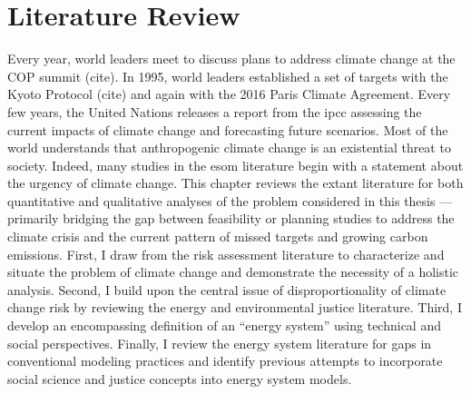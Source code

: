 \chapter{Literature Review}
\label{chapter:lit-review}
Every year, world leaders meet to discuss plans to address climate change at the
COP summit (cite). In 1995, world leaders established a set of targets with the
Kyoto Protocol (cite) and again with the 2016 Paris Climate Agreement. Every few
years, the United Nations releases a report from the \ac{ipcc} assessing the
current impacts of climate change and forecasting future scenarios. Most of the
world understands that anthropogenic climate change is an existential threat to
society. Indeed, many studies in the \ac{esom} literature begin with a statement
about the urgency of climate change. This chapter reviews the extant literature
for both quantitative and qualitative analyses of the problem considered in this
thesis --- primarily bridging the gap between feasibility or planning studies to
address the climate crisis and the current pattern of missed targets and growing
carbon emissions. First, I draw from the risk assessment literature to
characterize and situate the problem of climate change and demonstrate the
necessity of a holistic analysis. Second, I build upon the central issue of
disproportionality of climate change risk by reviewing the energy and
environmental justice literature. Third, I develop an encompassing definition of
an ``energy system'' using technical and social perspectives. Finally, I review
the energy system literature for gaps in conventional modeling practices and
identify previous attempts to incorporate social science and justice concepts
into energy system models.



% 
% 
% 




